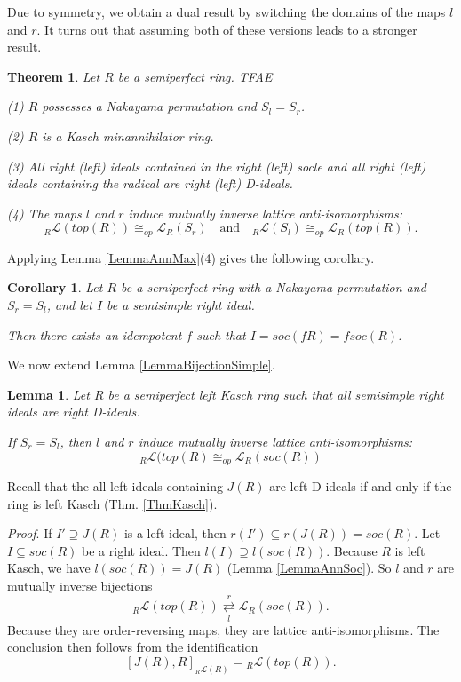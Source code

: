 \documentclass[11pt]{article}
\theoremstyle{plain}
\newtheorem{Lemma}[veta]{Lemma}
\newtheorem{Thm}[veta]{Theorem}
\newtheorem{Cor}[veta]{Corollary}
\theoremstyle{remark}
\theoremstyle{plain}
\newenvironment{Proof}{
  \par\medskip\noindent
  \textit{Proof}.
}{
\newline
\rightline{$\qedsymbol$}
}
\begin{document}
Due to symmetry, we obtain a dual result by switching the domains of the maps $l$ and $r$. It turns out that assuming both of these versions leads to a stronger result. 
\begin{Thm}\label{ThmAnn1} Let $R$ be a semiperfect ring. TFAE

(1)   $R$ possesses a Nakayama permutation and $S_l=S_r$.


(2) $R$ is a Kasch minannihilator ring.

(3) All right (left) ideals contained in the right (left) socle and all right (left) ideals containing the radical are right (left) D-ideals.    

(4) The maps $l$ and $r$ induce mutually inverse lattice anti-isomorphisms:
\[
    {}_R\mathcal{L}(top(R)) \cong_{op} \mathcal{L}_R(S_r)
    \quad \text{and} \quad
  {}_R\mathcal{L}(S_l)  \cong_{op} \mathcal{L}_R(top(R)).\]
\end{Thm}
Applying Lemma \ref{LemmaAnnMax}(4) gives the following corollary.
\begin{Cor} \label{CorDmain} Let $R$ be a semiperfect ring with a Nakayama permutation and $S_r=S_l$, and let $I$ be a semisimple right ideal.

Then there exists an idempotent $f$ such that $I=soc(fR)=fsoc(R)$.    
\end{Cor}
We now extend Lemma \ref{LemmaBijectionSimple}.
\begin{Lemma}\label{LemmaBijectionSemiSimple}
    Let $R$ be a semiperfect left Kasch ring such that all semisimple right ideals are right D-ideals. 

    If $S_r=S_l$, then $l$ and $r$ induce mutually inverse lattice anti-isomorphisms:
\[{}_R\mathcal{L}(top(R) \cong_{op} \mathcal{L}_R(soc(R))\]
\end{Lemma}
Recall that the all left ideals containing $J(R)$ are left D-ideals if and only if the ring is left Kasch (Thm. \ref{ThmKasch}).
\begin{Proof}  If $I'\supseteq J(R)$ is a left ideal, then $r(I')\subseteq r(J(R))=soc(R)$.   Let $I\subseteq soc(R)$ be a right ideal. Then $l(I)\supseteq l(soc(R))$. Because $R$ is left Kasch, we have $l(soc(R))=J(R)$ (Lemma \ref{LemmaAnnSoc}).   So $l$ and $r$ are mutually inverse bijections 
\[{}_R\mathcal{L}(top(R)) \underset{l}{\overset{r}{\rightleftarrows}} \mathcal{L}_R(soc(R)).\]
Because they are order-reversing maps, they are lattice anti-isomorphisms. The conclusion then follows from the identification 
\[ [J(R), R]_{_R\mathcal{L}(R)} = {}_R\mathcal{L}(top(R)).\]
\end{Proof}
\end{document}
